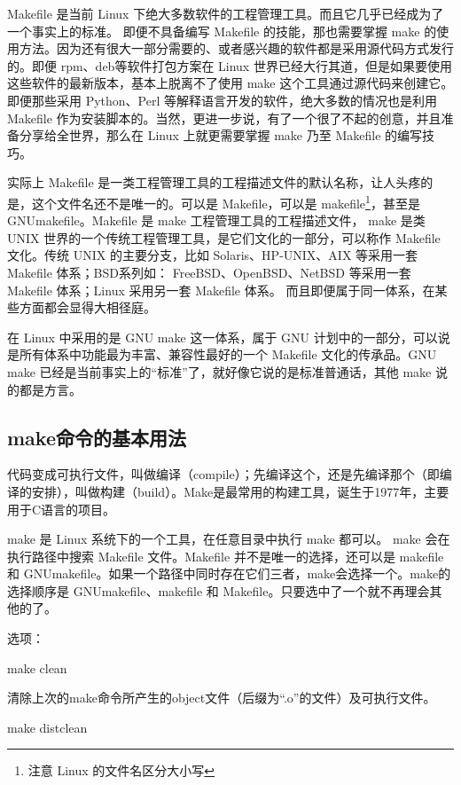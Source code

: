 Makefile 是当前 Linux 下绝大多数软件的工程管理工具。而且它几乎已经成为了一个事实上的标准。
即便不具备编写 Makefile 的技能，那也需要掌握 make 的使用方法。因为还有很大一部分需要的、或者感兴趣的软件都是采用源代码方式发行的。即便 rpm、deb等软件打包方案在 Linux 世界已经大行其道，但是如果要使用这些软件的最新版本，基本上脱离不了使用 make 这个工具通过源代码来创建它。即便那些采用 Python、Perl 等解释语言开发的软件，绝大多数的情况也是利用 Makefile 作为安装脚本的。当然，更进一步说，有了一个很了不起的创意，并且准备分享给全世界，那么在 Linux 上就更需要掌握 make 乃至 Makefile 的编写技巧。

实际上 Makefile 是一类工程管理工具的工程描述文件的默认名称，让人头疼的是，这个文件名还不是唯一的。可以是 Makefile，可以是 makefile\footnote{注意 Linux 的文件名区分大小写}，甚至是 GNUmakefile。Makefile 是 make 工程管理工具的工程描述文件， make 是类 UNIX 世界的一个传统工程管理工具，是它们文化的一部分，可以称作 Makefile 文化。传统 UNIX 的主要分支，比如 Solaris、HP-UNIX、AIX 等采用一套 Makefile 体系；BSD系列如： FreeBSD、OpenBSD、NetBSD 等采用一套 Makefile 体系；Linux 采用另一套 Makefile 体系。 而且即便属于同一体系，在某些方面都会显得大相径庭。

在 Linux 中采用的是 GNU make 这一体系，属于 GNU 计划中的一部分，可以说是所有体系中功能最为丰富、兼容性最好的一个 Makefile 文化的传承品。GNU make 已经是当前事实上的“标准”了，就好像它说的是标准普通话，其他  make 说的都是方言。



\subsection{make命令的基本用法}
代码变成可执行文件，叫做编译（compile）；先编译这个，还是先编译那个（即编译的安排），叫做构建（build）。Make是最常用的构建工具，诞生于1977年，主要用于C语言的项目。

make 是 Linux 系统下的一个工具，在任意目录中执行 make 都可以。 make 会在执行路径中搜索 Makefile 文件。Makefile 并不是唯一的选择，还可以是 makefile 和 GNUmakefile。如果一个路径中同时存在它们三者，make会选择一个。make的选择顺序是 GNUmakefile、makefile 和 Makefile。只要选中了一个就不再理会其他的了。

选项：






make clean

清除上次的make命令所产生的object文件（后缀为“.o”的文件）及可执行文件。

make distclean

